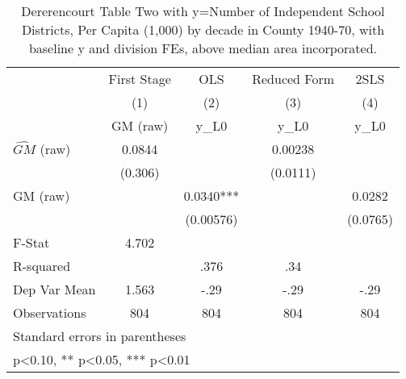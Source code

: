 \begin{table}[htbp]\centering
\def\sym#1{\ifmmode^{#1}\else\(^{#1}\)\fi}
\caption{Dererencourt Table Two with y=Number of Independent School Districts, Per Capita (1,000) by decade in County 1940-70, with baseline y and division FEs, above median area incorporated.}
\begin{tabular}{l*{4}{c}}
\toprule
                    & First Stage   &         OLS   &Reduced Form   &        2SLS   \\
                    &\multicolumn{1}{c}{(1)}&\multicolumn{1}{c}{(2)}&\multicolumn{1}{c}{(3)}&\multicolumn{1}{c}{(4)}\\
                    &\multicolumn{1}{c}{GM  (raw)}&\multicolumn{1}{c}{y\_L0}&\multicolumn{1}{c}{y\_L0}&\multicolumn{1}{c}{y\_L0}\\
\midrule
$\hat{GM}$ (raw)    &      0.0844   &               &     0.00238   &               \\
                    &     (0.306)   &               &    (0.0111)   &               \\
\addlinespace
GM  (raw)           &               &      0.0340***&               &      0.0282   \\
                    &               &   (0.00576)   &               &    (0.0765)   \\
\midrule
F-Stat              &       4.702   &               &               &               \\
R-squared           &               &        .376   &         .34   &               \\
Dep Var Mean        &       1.563   &        -.29   &        -.29   &        -.29   \\
Observations        &         804   &         804   &         804   &         804   \\
\bottomrule
\multicolumn{5}{l}{\footnotesize Standard errors in parentheses}\\
\multicolumn{5}{l}{\footnotesize * p<0.10, ** p<0.05, *** p<0.01}\\
\end{tabular}
\end{table}
